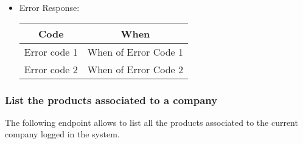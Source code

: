 \begin{itemize}
    \item Error Response:
    \begin{table}[!h]
    \centering 
    \begin{tabular}{|c|c|}
    \hline
    \multicolumn{1}{|c|}{\textbf{Code}} & \multicolumn{1}{c|}{\textbf{When}} \\ \hline
    Error code 1 & When of Error Code 1 \\\hline
    Error code 2 & When of Error Code 2 \\\hline
    \end{tabular} 
    \end{table} 
    
\end{itemize}


\subsubsection*{List the products associated to a company}

The following endpoint allows to list all the products associated to the current company logged in the system.

